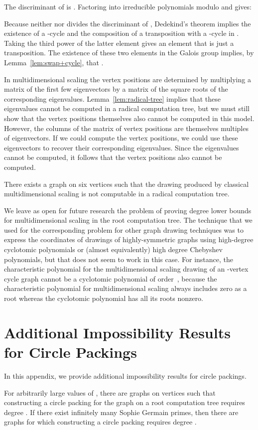 \documentclass[oribibl,10pt]{llncs}
\begin{document}
\begin{appendix}
The discriminant of  is .  Factoring  into irreducible polynomials modulo  and  gives:



Because neither  nor  divides the discriminant of , Dedekind's theorem implies the existence of a -cycle and the composition of a transposition with a -cycle in . Taking the third power of the latter element gives an element that is just a transposition. The existence of these two elements in the Galois group implies, by Lemma~\ref{lem:swap+cycle}, that .

In multidimensional scaling the vertex positions are determined by multiplying a matrix of the first few eigenvectors by a matrix of the square roots of the corresponding eigenvalues.  Lemma~\ref{lem:radical-tree} implies that these eigenvalues cannot be computed in a radical computation tree, but we must still show that the vertex positions themselves also cannot be computed in this model. However, the columns of the matrix of vertex positions are themselves multiples of eigenvectors. If we could compute the vertex positions, we could use these eigenvectors to recover their corresponding eigenvalues. Since the eigenvalues cannot be computed, it follows that the vertex positions also cannot be computed.

\begin{theorem}
There exists a graph on six vertices such that the drawing produced by classical multidimensional scaling is not computable in a radical computation tree.
\end{theorem}

We leave as open for future research the problem of proving degree lower bounds for multidimensional scaling in the root computation tree. The technique that we used for the corresponding problem for other graph drawing techniques was to express the coordinates of drawings of highly-symmetric graphs using high-degree cyclotomic polynomials or (almost equivalently) high degree Chebyshev polynomials, but that does not seem to work in this case. For instance, the characteristic polynomial for the multidimensional scaling drawing of an -vertex cycle graph cannot be a cyclotomic polynomial of order~, because the characteristic polynomial for multidimensional scaling always includes zero as a root whereas the cyclotomic polynomial has all its roots nonzero.

\clearpage
\section{Additional Impossibility Results for Circle Packings}
\label{app:circles}
In this appendix, we provide additional impossibility results for circle packings.
\begin{theorem}
For arbitrarily large values of ,
there are graphs on  vertices such that constructing a circle packing for the graph on a root computation tree requires degree . If there exist infinitely many Sophie Germain primes, then there are graphs for which constructing a circle packing requires degree .
\end{theorem}


\end{appendix}
\end{document}
